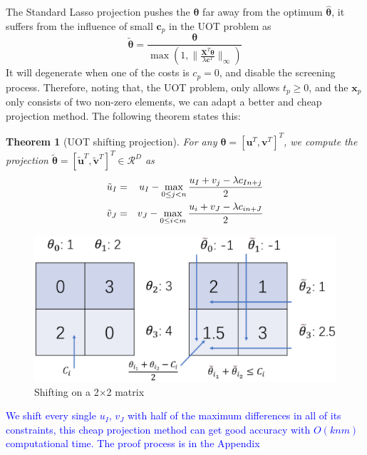 \documentclass[twoside]{article}
\theoremstyle{plain}
\newtheorem{thm}{Theorem}
\newcommand{\mat}[1]{\mathbf{#1}}
\renewcommand{\vec}[1]{\bm{#1}}
\newcommand{\changeXS}[1]{\textcolor{blue}{#1}}
\begin{document}
The Standard Lasso projection pushes the $\vec{\theta}$ far away from the optimum $\hat{\vec{\theta}}$, it suffers from the influence of small $\vec c_p$ in the UOT problem as
$$\tilde{\vec{\theta}} = \frac{\vec\theta}{\max(1, \|\frac{\mat{X}^T\vec\theta}{\lambda \vec{c}^{T}}\|_{\infty})}$$
It will degenerate when one of the costs is $c_p = 0$, and disable the screening process. Therefore, noting that, the UOT problem, only allows $t_p \geq 0$, and the $\vec{x}_p$ only consists of two non-zero elements, we can adapt a better and cheap projection method. The following theorem states this:
\begin{thm}[UOT shifting projection]
\label{Thm:UOT_ShiftProjection}
For any $\vec{\theta} = [{\vec{u}}^T,{\vec{v}}^T]^T$, we compute the projection $\tilde{\vec{\theta}} = [\tilde{\vec{u}}^T,\tilde{\vec{v}}^T]^T \in \mathcal{R}^{D}$ as
\begin{eqnarray}
\tilde{{u}}_I &=& {{u}}_I - \max_{0\leq j < n} \frac{{{u}}_I +{{v}}_j - \lambda{c}_{In+j}}{2} \notag\\
\tilde{{v}}_J &=& {{v}}_J - \max_{0 \leq i < m} \frac{{{u}}_i +{{v}}_J - \lambda{c}_{in+J}}{2}\notag\\
\label{eq:uotproj}
\end{eqnarray}
\end{thm}
\begin{figure}[h]
\begin{center}
\includegraphics[width = \linewidth]{pic/shifting}
\caption{Shifting on a 2$\times$2 matrix}
\end{center}
\end{figure}

\changeXS{We shift every single $u_I$, $v_J$ with half of the maximum differences in all of its constraints, this cheap projection method can get good accuracy with $O(knm)$ computational time. The proof process is in the Appendix}
%
\end{document}
